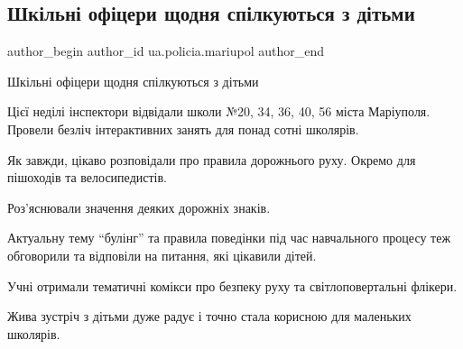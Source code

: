  
 
 
 
 

\subsection{Шкільні офіцери щодня спілкуються з дітьми}
\label{sec:14_05_2021.fb.ua.policia.mariupol.1.shk_ln__of_tseri_shc}

\ifcmt
 author_begin
   author_id ua.policia.mariupol
 author_end
\fi

Шкільні офіцери щодня спілкуються з дітьми

Цієї неділі інспектори відвідали школи №20, 34, 36, 40, 56 міста Маріуполя.
Провели безліч інтерактивних занять для понад сотні школярів.

Як завжди, цікаво розповідали про правила дорожнього руху. Окремо для пішоходів
та велосипедистів.

Роз'яснювали значення деяких дорожніх знаків.

Актуальну тему \enquote{булінг} та правила поведінки під час навчального процесу теж
обговорили та відповіли на питання, які цікавили дітей.

Учні отримали тематичні комікси про безпеку руху та світлоповертальні флікери. 

Жива зустріч з дітьми дуже радує і точно стала корисною для маленьких школярів.
